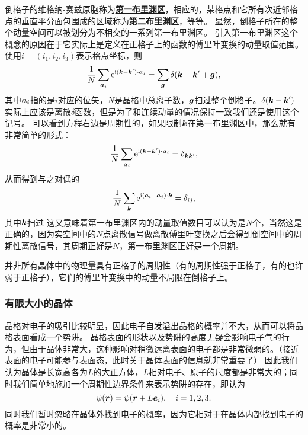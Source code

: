 \documentclass[hyperref, UTF8, a4paper]{ctexart}
\newcommand*{\ii}{\mathrm{i}}
\newcommand*{\ee}{\mathrm{e}}
\newcommand*{\concept}[1]{\underline{\textbf{#1}}}
\begin{document}
倒格子的维格纳-赛兹原胞称为\concept{第一布里渊区}，相应的，某格点和它所有次近邻格点的垂直平分面包围成的区域称为\concept{第二布里渊区}，等等。
显然，倒格子所在的整个动量空间可以被划分为不相交的一系列第一布里渊区。
引入第一布里渊区这个概念的原因在于它实际上是定义在正格子上的函数的傅里叶变换的动量取值范围。
使用$i=(i_1, i_2, i_3)$表示格点坐标，则
\begin{equation}
    \frac{1}{N} \sum_{\vb*{a}_i} \ee^{\ii (\vb*{k} - \vb*{k}') \cdot \vb*{a}_i} = \sum_{\vb*{g}} \delta(\vb*{k} - \vb*{k}' + \vb*{g}),
\end{equation}
其中$\vb*{a}_i$指的是$i$对应的位矢，$N$是晶格中总离子数，$\vb*{g}$扫过整个倒格子。$\delta(\vb*{k} - \vb*{k}')$实际上应该是离散$\delta$函数，但是为了和连续动量的情况保持一致我们还是使用这个记号。
可以看到方程右边是周期性的，如果限制$\vb*{k}$在第一布里渊区中，那么就有非常简单的形式：
\begin{equation}
    \frac{1}{N} \sum_{\vb*{a}_i} \ee^{\ii (\vb*{k} - \vb*{k}') \cdot \vb*{a}_i} = \delta_{\vb*{k} \vb*{k}'},
\end{equation}
从而得到与之对偶的
\[
    \frac{1}{N} \sum_{\vb*{k}} \ee^{\ii (\vb*{a}_i - \vb*{a}_j) \cdot \vb*{k}} = \delta_{ij},
\]
其中$\vb*{k}$扫过
这又意味着第一布里渊区内的动量取值数目可以认为是$N$个，当然这是正确的，因为实空间中的$N$点离散信号做离散傅里叶变换之后会得到倒空间中的周期性离散信号，其周期正好是$N$，第一布里渊区正好是一个周期。

并非所有晶体中的物理量具有正格子的周期性（有的周期性强于正格子，有的也许弱于正格子），它们的傅里叶变换中的动量不局限在倒格子上。

\subsubsection{有限大小的晶体}

晶格对电子的吸引比较明显，因此电子自发溢出晶格的概率并不大，从而可以将晶格表面看成一个势阱。
晶格表面的形状以及势阱的高度无疑会影响电子气的行为，但由于晶体非常大，这种影响对稍微远离表面的电子都是非常微弱的。（接近表面的电子可能参与表面态，此时关于晶体表面的信息就非常重要了）
因此我们认为晶体是长宽高各为$L$的大正方体，$L$相对电子、原子的尺度都是非常大的；同时我们简单地施加一个周期性边界条件来表示势阱的存在，即认为
\begin{equation}
    \psi(\vb*{r}) = \psi(\vb*{r} + L \vb*{e}_i), \quad i = 1, 2, 3.
    \label{eq:periodic-boundary}
\end{equation}
同时我们暂时忽略在晶体外找到电子的概率，因为它相对于在晶体内部找到电子的概率是非常小的。
\end{document}

